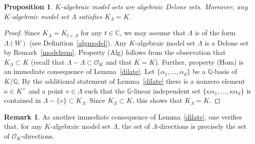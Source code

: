 \documentclass[a4paper]{amsart}
\newtheorem{prop}[theorem]{Proposition}
\theoremstyle{definition}
\newtheorem{rem}[theorem]{Remark}
\numberwithin{equation}{section}
\numberwithin{theorem}{section}
\begin{document}
\begin{prop}\label{cmsads}
$K$-algebraic model sets are algebraic Delone
sets. Moreover, any $K$-algebraic model set $\varLambda$
satisfies $K_{\varLambda}=K$.
\end{prop}
\begin{proof}
Since $K_{\varLambda}=K_{t+\varLambda}$ for any $t\in{\mathbb{C}}$, we may
assume that $\varLambda$ is of the
form $\varLambda(W)$ (see Definition~\ref{algmodel}). Any $K$-algebraic model set $\varLambda$ is a Delone 
set by Remark~\ref{modelrem}. Property (Alg) follows from the
observation that $K_{\varLambda}\subset K$ (recall that
$\varLambda-\varLambda\subset\mathcal{O}_K$ and that $\overline{K}=K$). Further,
property (Hom) is an immediate consequence of Lemma~\ref{dilate}.  Let
$\{\alpha_1,\dots,\alpha_d\}$ be a ${\mathbb{Q}}$-basis of $K/{\mathbb{Q}}$. By the additional statement of
Lemma~\ref{dilate} there is a nonzero element $\kappa\in K^+$ and a
point 
$v\in\varLambda$ such
that the
${\mathbb{Q}}$-linear independent set
$\{\kappa\alpha_1,\dots,\kappa\alpha_d\}$ is contained in
$\varLambda-\{v\}\subset K_{\varLambda}$. Since
$K_{\varLambda}\subset K$, this shows that $K_{\varLambda}=K$.   
\end{proof}

\begin{rem}\label{okdirections}
As another immediate consequence of Lemma~\ref{dilate}, one verifies
that, for any $K$-algebraic model set $\varLambda$, the set of 
$\varLambda$-directions is precisely the set of
 $\mathcal{O}_{K}$-directions. 
\end{rem}
\end{document}
